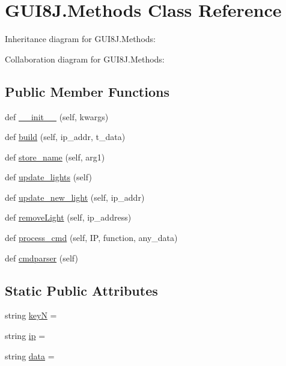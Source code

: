 \hypertarget{classGUI8J_1_1Methods}{}\section{G\+U\+I8\+J.\+Methods Class Reference}
\label{classGUI8J_1_1Methods}


Inheritance diagram for G\+U\+I8\+J.\+Methods\+:


Collaboration diagram for G\+U\+I8\+J.\+Methods\+:
\subsection*{Public Member Functions}
\begin{DoxyCompactItemize}
\item 
def \hyperlink{classGUI8J_1_1Methods_adc3fea247ec7f4ff14a89268ee621359}{\+\_\+\+\_\+init\+\_\+\+\_\+} (self, kwargs)
\item 
def \hyperlink{classGUI8J_1_1Methods_af96b0e255602c98879c512bddcaebed2}{build} (self, ip\+\_\+addr, t\+\_\+data)
\item 
def \hyperlink{classGUI8J_1_1Methods_ad0dd20d8d597befe81e356d418f47a65}{store\+\_\+name} (self, arg1)
\item 
def \hyperlink{classGUI8J_1_1Methods_ab9cf7acacb2eb61de67d4b24b702d7c8}{update\+\_\+lights} (self)
\item 
def \hyperlink{classGUI8J_1_1Methods_a037fe622e6ad36e48f3d5d4748968eda}{update\+\_\+new\+\_\+light} (self, ip\+\_\+addr)
\item 
def \hyperlink{classGUI8J_1_1Methods_aa82c91d2adbd53757d572a3504560441}{remove\+Light} (self, ip\+\_\+address)
\item 
def \hyperlink{classGUI8J_1_1Methods_a46a806bf76cd8a08b8c71a63bb954c37}{process\+\_\+cmd} (self, IP, function, any\+\_\+data)
\item 
def \hyperlink{classGUI8J_1_1Methods_a8f3190273093fe470288af2089fef4d6}{cmdparser} (self)
\end{DoxyCompactItemize}
\subsection*{Static Public Attributes}
\begin{DoxyCompactItemize}
\item 
string \hyperlink{classGUI8J_1_1Methods_a28bf2c3a7818a8c36f162990c504c861}{keyN} = \textquotesingle{}\textquotesingle{}
\item 
string \hyperlink{classGUI8J_1_1Methods_af8a350aa65fdbdc2a64b36b5e86dca74}{ip} = \textquotesingle{}\textquotesingle{}
\item 
string \hyperlink{classGUI8J_1_1Methods_aa16d5688c16569e965c5be18ba771a6f}{data} = \textquotesingle{}\textquotesingle{}
\end{DoxyCompactItemize}


